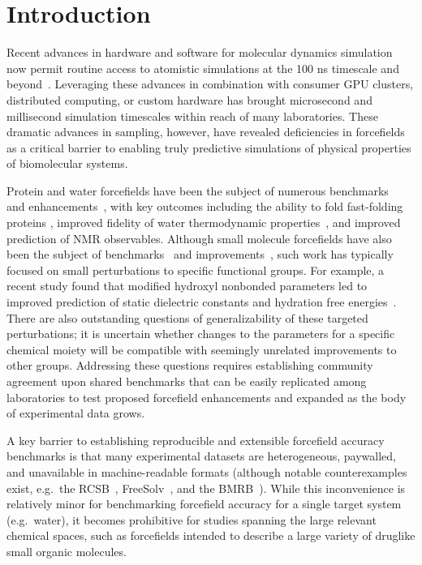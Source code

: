 \documentclass[aip, jcp, reprint]{revtex4-1}  %
\begin{document}
\section{Introduction}

Recent advances in hardware and software for molecular dynamics simulation now permit routine access to atomistic simulations at the 100 ns timescale and beyond~\cite{salomon2013routine}.
Leveraging these advances in combination with consumer GPU clusters, distributed computing, or custom hardware has brought microsecond and millisecond simulation timescales within reach of many laboratories.  
These dramatic advances in sampling, however, have revealed deficiencies in forcefields as a critical barrier to enabling truly predictive simulations of physical properties of biomolecular systems.  

Protein and water forcefields have been the subject of numerous benchmarks~\cite{lindorff2012systematic, beauchamp2012protein, best2008} and enhancements~\cite{li2011iterative, best2012optimization, Lindorff-Larsen2010}, with key outcomes including the ability to fold fast-folding proteins \cite{shaw2011, ensign2007heterogeneity, Voelz2010}, improved fidelity of water thermodynamic properties~\cite{horn2004}, and improved prediction of NMR observables.  
Although small molecule forcefields have also been the subject of benchmarks~\cite{caleman2011force, fischer2015properties, zhang2015force} and improvements~\cite{fennell2014fixed}, such work has typically focused on small perturbations to specific functional groups.  
For example, a recent study found that modified hydroxyl nonbonded parameters led to improved prediction of static dielectric constants and hydration free energies~\cite{fennell2014fixed}.
There are also outstanding questions of generalizability of these targeted perturbations; it is uncertain whether changes to the parameters for a specific chemical moiety will be compatible with seemingly unrelated improvements to other groups.
Addressing these questions requires establishing community agreement upon shared benchmarks that can be easily replicated among laboratories to test proposed forcefield enhancements and expanded as the body of experimental data grows.

A key barrier to establishing reproducible and extensible forcefield accuracy benchmarks is that many experimental datasets are heterogeneous, paywalled, and unavailable in machine-readable formats (although notable counterexamples exist, e.g.~the RCSB~\cite{Berman2000}, FreeSolv~\cite{freesolv}, and the BMRB~\cite{Ulrich2008}).  
While this inconvenience is relatively minor for benchmarking forcefield accuracy for a single target system (e.g.~water), it becomes prohibitive for studies spanning the large relevant chemical spaces, such as forcefields intended to describe a large variety of druglike small organic molecules.  
\end{document}
